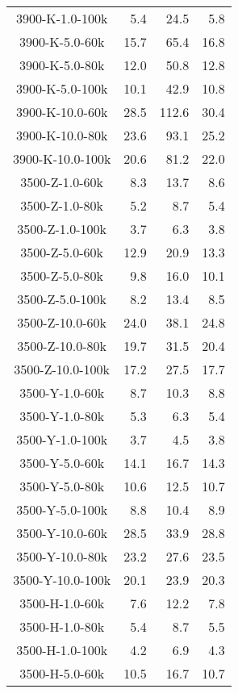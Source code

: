 \begin{longtable}{crrr}
    3900-K-1.0-100k  &    5.4 &   24.5 &    5.8 \\
    3900-K-5.0-60k   &   15.7 &   65.4 &   16.8 \\
    3900-K-5.0-80k   &   12.0 &   50.8 &   12.8 \\
    3900-K-5.0-100k  &   10.1 &   42.9 &   10.8 \\
    3900-K-10.0-60k  &   28.5 &  112.6 &   30.4 \\
    3900-K-10.0-80k  &   23.6 &   93.1 &   25.2 \\
    3900-K-10.0-100k &   20.6 &   81.2 &   22.0 \\
    3500-Z-1.0-60k   &    8.3 &   13.7 &    8.6 \\
    3500-Z-1.0-80k   &    5.2 &    8.7 &    5.4 \\
    3500-Z-1.0-100k  &    3.7 &    6.3 &    3.8 \\
    3500-Z-5.0-60k   &   12.9 &   20.9 &   13.3 \\
    3500-Z-5.0-80k   &    9.8 &   16.0 &   10.1 \\
    3500-Z-5.0-100k  &    8.2 &   13.4 &    8.5 \\
    3500-Z-10.0-60k  &   24.0 &   38.1 &   24.8 \\
    3500-Z-10.0-80k  &   19.7 &   31.5 &   20.4 \\
    3500-Z-10.0-100k &   17.2 &   27.5 &   17.7 \\
    3500-Y-1.0-60k   &    8.7 &   10.3 &    8.8 \\
    3500-Y-1.0-80k   &    5.3 &    6.3 &    5.4 \\
    3500-Y-1.0-100k  &    3.7 &    4.5 &    3.8 \\
    3500-Y-5.0-60k   &   14.1 &   16.7 &   14.3 \\
    3500-Y-5.0-80k   &   10.6 &   12.5 &   10.7 \\
    3500-Y-5.0-100k  &    8.8 &   10.4 &    8.9 \\
    3500-Y-10.0-60k  &   28.5 &   33.9 &   28.8 \\
    3500-Y-10.0-80k  &   23.2 &   27.6 &   23.5 \\
    3500-Y-10.0-100k &   20.1 &   23.9 &   20.3 \\
    3500-H-1.0-60k   &    7.6 &   12.2 &    7.8 \\
    3500-H-1.0-80k   &    5.4 &    8.7 &    5.5 \\
    3500-H-1.0-100k  &    4.2 &    6.9 &    4.3 \\
    3500-H-5.0-60k   &   10.5 &   16.7 &   10.7 \\

\end{longtable}
